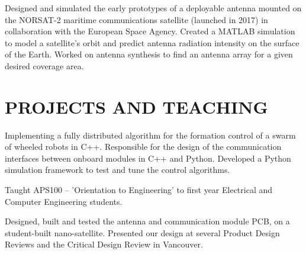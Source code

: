 \documentclass{ResumeTemplate}
\begin{document}

	\workitemstwo
	{Designed and simulated the early prototypes of a deployable antenna mounted on the NORSAT-2 maritime communications satellite (launched in 2017) in collaboration with the European Space Agency.}
	{Created a MATLAB simulation to model a satellite's orbit and predict antenna radiation intensity on the surface of the Earth. Worked on antenna synthesis to find an antenna array for a given desired coverage area.}
	
	\section{PROJECTS AND TEACHING}
	

	\workitemsthree
	{Implementing a fully distributed algorithm for the formation control of a swarm of wheeled robots in C++.}
	{Responsible for the design of the communication interfaces between onboard modules in C++ and Python.}
	{Developed a Python simulation framework to test and tune the control algorithms. }
	

	\workitemsone
	{Taught APS100 -- 'Orientation to Engineering' to first year Electrical and Computer Engineering students.}
	

	\workitemstwo
	{Designed, built and tested the antenna and communication module PCB, on a student-built nano-satellite.}
	{Presented our design at several Product Design Reviews and the Critical Design Review in Vancouver.}

	
\end{document}
